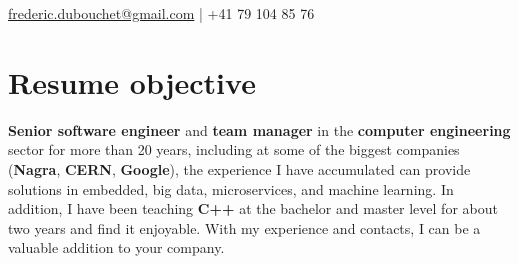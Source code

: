 \documentclass[a4paper]{deedy-resume} %
\begin{document}
\lastupdated


	{\href{mailto:frederic.dubouchet@gmail.com}{frederic.dubouchet@gmail.com} | +41 79 104 85 76}

\section{Resume objective}

\begin{flushleft}
	\textbf{Senior software engineer} and \textbf{team manager} in the \textbf{computer engineering} sector for more than 
	20 years, including at some of the biggest companies (\textbf{Nagra}, \textbf{CERN}, 
	\textbf{Google}), the experience I have accumulated can provide solutions in embedded, big data,
	microservices, and machine learning. In addition, I have been teaching \textbf{C++} at the bachelor 
	and master level for about two years and find it enjoyable. With my experience and contacts, 
	I can be a valuable addition to your company.
\end{flushleft}


\noindent\makebox[\linewidth]{\color{headings}\rule{\paperwidth}{0.4pt}}

\end{document}
